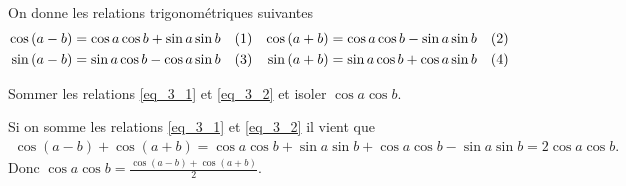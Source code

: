 
\hauteurLargeurCadreReponse		{7mm}{6.75cm}
\initialisationEntrainement

On donne les relations trigonométriques suivantes
\begin{align*}
	\cos \left( a - b \right) &= \cos a \cos b + \sin a \sin b \Label{eq_3_1} &
	\cos \left( a + b \right) &= \cos a \cos b - \sin a \sin b \Label{eq_3_2} \\
	\sin \left( a - b \right) &= \sin a \cos b - \cos a \sin b \Label{eq_3_3} &
	\sin \left( a + b \right) &= \sin a \cos b + \cos a \sin b \Label{eq_3_4}
\end{align*}


\begin{enonce}
	Sommer les relations \eqref{eq_3_1} et \eqref{eq_3_2} et isoler $\cos a \cos b$.
	\end{enonce}
	
	
	\begin{corrige}
		Si on somme les relations \eqref{eq_3_1} et \eqref{eq_3_2} il vient que
		\begin{align*}
			\cos \left( a - b \right) + \cos \left( a + b \right) = \cos a \cos b + \sin a \sin b + \cos a \cos b - \sin a \sin b = 2 \cos a \cos b.
		\end{align*}
	Donc $\cos a \cos b = \frac{\cos \left( a - b \right) + \cos \left( a + b \right)}{2}$.
	\end{corrige}




